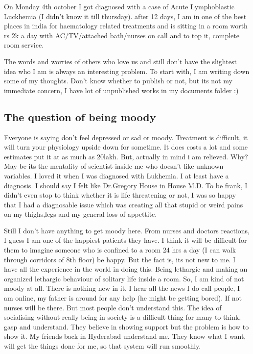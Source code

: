 \vskip 2pt

On Monday 4th october I got diagnosed with a case of Acute Lymphoblastic Luckhemia 
(I didn't know it till thursday). after 12 days, I am in one of the best places in
 india for haematology related treatments and is sitting in a room worth rs 2k a day
 with AC/TV/attached bath/nurses on call and to top it, complete room service.

The words and worries of others who love us and still don't have the slightest idea
 who I am is always an interesting problem. To start with, I am writing down some of
 my thoughts. Don't know whether to publish or not, but its not my immediate concern,
 I have lot of unpublished works in my documents folder :)

\subsection*{The question of being moody} 

Everyone is saying don't feel depressed or sad or moody. Treatment is difficult, it 
will turn your physiology upside down for sometime. It does costs a lot and some 
estimates put it at as much as 20lakh. But, actually in mind i am relieved. Why? May 
be its the mentality of scientist inside me who doesn't like unknown variables. I loved
 it when I was diagnosed with Lukhemia. I at least have a diagnosis. I should say I 
felt like Dr.Gregory House in House M.D. To be frank, I didn't even stop to think whether
 it is life threatening or not, I was so happy that I had a diagnosable issue which was 
creating all that stupid or weird pains on my thighs,legs and my general loss of appettite.

Still I don't have anything to get moody here. From nurses and doctors reactions, I guess
I am one of the happiest patients they have. I think it will be difficult for them to 
imagine someone who is confined to a room 24 hrs a day (I can walk through corridors of
 8th floor) be happy. But the fact is, its not new to me. I have all the experience in 
the world in doing this. Being lethargic and making an organized lethargic behaviour of
solitary life inside a room. So, I am kind of not moody at all. There is nothing new in it,
I hear all the news I do call people, I am online, my father is around for any help (he might
be getting bored). If not nurses will be there. But most people don't understand this. The
idea of socialising without really being in society is a difficult thing for many to think, 
gasp and understand. They believe in showing support but the problem is how to show it. My 
friends back in Hyderabad understand me. They know what I want, will get the things done for
me, so that system will run smoothly. 


